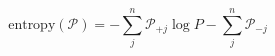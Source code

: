 \begin{equation}
\text{entropy}(\mathcal P) = -\sum_j^n\mathcal P_{+j}\log P -\sum_j^n\mathcal P_{-j}
\end{equation}